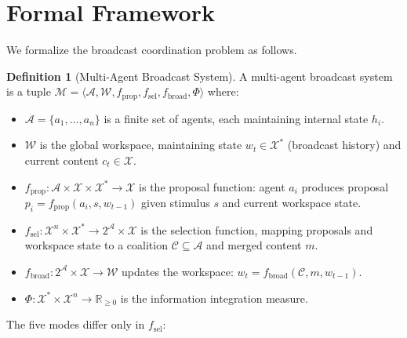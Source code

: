 \documentclass[11pt]{article}
\theoremstyle{definition}
\newtheorem{definition}{Definition}
\begin{document}
\section{Formal Framework}
\label{sec:formal}

We formalize the broadcast coordination problem as follows.

\begin{definition}[Multi-Agent Broadcast System]
A multi-agent broadcast system is a tuple $\mathcal{M} = \langle \mathcal{A}, \mathcal{W},
f_{\text{prop}}, f_{\text{sel}}, f_{\text{broad}}, \Phi \rangle$ where:
\begin{itemize}[noitemsep]
\item $\mathcal{A} = \{a_1, \ldots, a_n\}$ is a finite set of agents, each maintaining
  internal state $h_i$.
\item $\mathcal{W}$ is the global workspace, maintaining state $w_t \in \mathcal{X}^*$
  (broadcast history) and current content $c_t \in \mathcal{X}$.
\item $f_{\text{prop}}: \mathcal{A} \times \mathcal{X} \times \mathcal{X}^* \to \mathcal{X}$
  is the proposal function: agent $a_i$ produces proposal $p_i = f_{\text{prop}}(a_i, s, w_{t-1})$
  given stimulus $s$ and current workspace state.
\item $f_{\text{sel}}: \mathcal{X}^n \times \mathcal{X}^* \to 2^{\mathcal{A}} \times \mathcal{X}$
  is the selection function, mapping proposals and workspace state to a coalition
  $\mathcal{C} \subseteq \mathcal{A}$ and merged content $m$.
\item $f_{\text{broad}}: 2^{\mathcal{A}} \times \mathcal{X} \to \mathcal{W}$ updates the
  workspace: $w_t = f_{\text{broad}}(\mathcal{C}, m, w_{t-1})$.
\item $\Phi: \mathcal{X}^* \times \mathcal{X}^n \to \mathbb{R}_{\geq 0}$ is the information
  integration measure.
\end{itemize}
\end{definition}

The five modes differ only in $f_{\text{sel}}$:
\end{document}
